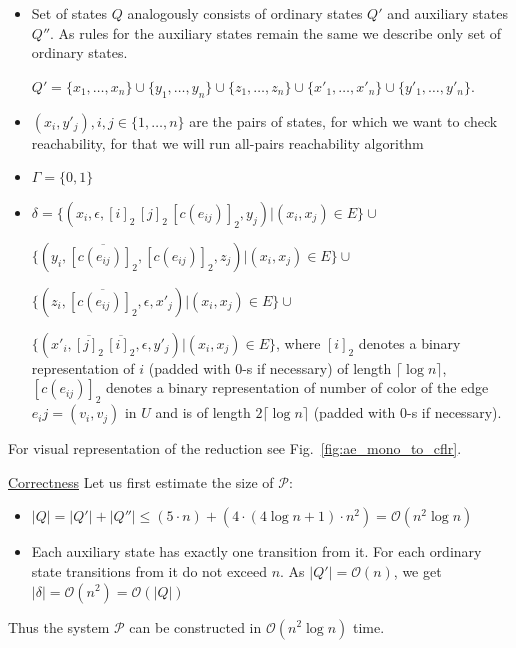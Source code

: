 \documentclass[12pt]{article}
\begin{document}
\begin{itemize}
    \item Set of states $Q$ analogously consists of ordinary states $Q'$ and auxiliary states $Q''$. As rules for the auxiliary states remain the same we describe only set of ordinary states. 
    
    $Q' = \{x_1, \ldots, x_n\} \cup \{y_1, \ldots, y_n\} \cup \{z_1, \ldots, z_n\} \cup \{x'_1, \ldots, x'_n\} \cup \{y'_1, \ldots, y'_n\}$.
     
    \item $(x_i, y'_j), i, j \in \{1, \ldots, n\}$ are the pairs of states, for which we want to check reachability, for that we will run all-pairs reachability algorithm
    \item $\Gamma = \{0, 1\}$
    \item $\delta = 
    \{(x_i, \epsilon, [i]_2 \, [j]_2 \, [c(e_{ij})]_2, y_j)|(x_i, x_j) \in E\} \cup$
    
    $\{(y_i, \overline{[c(e_{ij})]_2}, [c(e_{ij})]_2, z_j)|(x_i, x_j) \in E\} \cup$
    
    $\{(z_i, \overline{[c(e_{ij})]_2}, \epsilon, x'_j)|(x_i, x_j) \in E\} \cup$
    
    $\{(x'_i, \overline{[j]_2} \, \overline{[i]_2}, \epsilon, y'_j)|(x_i, x_j) \in E\}$, where $[i]_2$ denotes a binary representation of $i$ (padded with 0-s if necessary) of length $\lceil \log n \rceil$, $[c(e_{ij})]_2$ denotes a binary representation of number of color of the edge $e_ij = (v_i, v_j)$ in $U$ and is of length $2 \lceil \log n \rceil$  (padded with 0-s if necessary). 
\end{itemize}

For visual representation of the reduction see Fig.~\ref{fig:ae_mono_to_cflr}.

\underline{Correctness} Let us first estimate the size of $\mathcal{P}$:

\begin{itemize}
    \item $|Q| = |Q'| + |Q''| \le (5 \cdot n) + (4 \cdot (4 \log n + 1) \cdot n^2) = \mathcal{O}(n^2 \log n)$
    \item Each auxiliary state has exactly one transition from it. For each ordinary state transitions from it do not exceed $n$. As $|Q'| = \mathcal{O}(n)$, we get $|\delta| = \mathcal{O}(n^2) = \mathcal{O}(|Q|)$ 
\end{itemize}

Thus the system $\mathcal{P}$ can be constructed in $\mathcal{O}(n^2 \log n)$ time.
\end{document}
